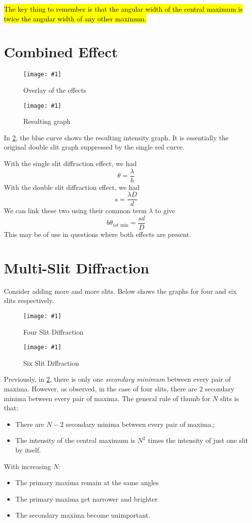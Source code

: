 \documentclass[a4paper,12pt]{article}
\let\oldsection\section
\renewcommand\section{\clearpage\oldsection}
\newcommand{\img}[4]{\begin{center}
  \begin{figure}[H]
    \centering
    \texttt{[image: \#1]}
    \caption{#3}
    \label{fig:#4}
  \end{figure}
\end{center}}
\begin{document}
\hl{The key thing to remember is that the angular width of the central maximum is twice the angular width of any other maximum.}

\section{Combined Effect}

\begin{minipage}{0.475\textwidth}
  \img{combine1.png}{1}{Overlay of the effects}{combined}
\end{minipage}\hspace*{0.05\textwidth}%
\begin{minipage}{0.475\textwidth}
  \img{combine2.png}{1}{Resulting graph}{combined2}
\end{minipage}

In \cref{fig:combined2}, the blue curve shows the resulting intensity graph. It is essentially the original double slit graph suppressed by the single red curve.

With the single slit diffraction effect, we had $$\theta = \frac{\lambda}{b}$$
With the double slit diffraction effect, we had $$s = \frac{\lambda D}{d}$$
We can link these two using their common term $\lambda$ to give
$$b\theta_\text{1st min} = \frac{sd}{D}$$
This may be of use in questions where both effects are present.


\section{Multi-Slit Diffraction}

Consider adding more and more slits. Below shows the graphs for four and six slits respectively.

\begin{minipage}{0.475\textwidth}
  \img{fourslit.png}{1}{Four Slit Diffraction}{fourslit}
\end{minipage}\hspace*{0.05\textwidth}%
\begin{minipage}{0.475\textwidth}
  \img{sixslit.png}{1}{Six Slit Diffraction}{sixslit}
\end{minipage}

Previously, in \cref{fig:combined2}, there is only one \textit{secondary minimum} between every pair of maxima. However, as observed, in the case of four slits, there are 2 secondary minima between every pair of maxima. The general rule of thumb for $N$ slits is that:
\begin{itemize}
  \item There are $N - 2$ secondary minima between every pair of maxima.;
  \item The intensity of the central maximum is $N^2$ times the intensity of just one slit by itself.
\end{itemize}
With increasing $N$:
\begin{itemize}
  \item The primary maxima remain at the same angles
  \item The primary maxima get narrower and brighter
  \item The secondary maxima become unimportant.
\end{itemize}
\end{document}
